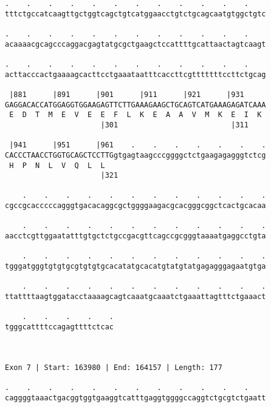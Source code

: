 \documentclass{article}
\begin{document}
\begin{Verbatim}
.    .    .    .    .    .    .    .    .    .    .    .    
tttctgccatcaagttgctggtcagctgtcatggaacctgtctgcagcaatgtggctgtc
                                                            
.    .    .    .    .    .    .    .    .    .    .    .    
acaaaacgcagcccaggacgagtatgcgctgaagctccattttgcattaactagtcaagt
                                                            
.    .    .    .    .    .    .    .    .    .    .    .    
acttacccactgaaaagcacttcctgaaataatttcaccttcgtttttttccttctgcag
                                                            
 |881      |891      |901      |911      |921      |931     
GAGGACACCATGGAGGTGGAAGAGTTCTTGAAAGAAGCTGCAGTCATGAAAGAGATCAAA
 E  D  T  M  E  V  E  E  F  L  K  E  A  A  V  M  K  E  I  K 
                      |301                          |311    
  
 |941      |951      |961    .    .    .    .    .    .    .
CACCCTAACCTGGTGCAGCTCCTTGgtgagtaagcccggggctctgaagagagggtctcg
 H  P  N  L  V  Q  L  L                                     
                      |321                                  
  
    .    .    .    .    .    .    .    .    .    .    .    .
cgccgcacccccagggtgacacaggcgctggggaagacgcacgggcggctcactgcacaa
                                                            
    .    .    .    .    .    .    .    .    .    .    .    .
aacctcgttggaatatttgtgctctgccgacgttcagccgcgggtaaaatgaggcctgta
                                                            
    .    .    .    .    .    .    .    .    .    .    .    .
tgggatgggtgtgtgcgtgtgtgcacatatgcacatgtatgtatgagagggagaatgtga
                                                            
    .    .    .    .    .    .    .    .    .    .    .    .
ttattttaagtggatacctaaaagcagtcaaatgcaaatctgaaattagtttctgaaact
                                                            
    .    .    .    .    .
tgggcattttccagagttttctcac
                         
                         
 
Exon 7 | Start: 163980 | End: 164157 | Length: 177
 
.    .    .    .    .    .    .    .    .    .    .    .    
caggggtaaactgacggtggtgaaggtcatttgaggtggggccaggtctgcgtctgaatt
                                                            

\end{Verbatim}
\end{document}
